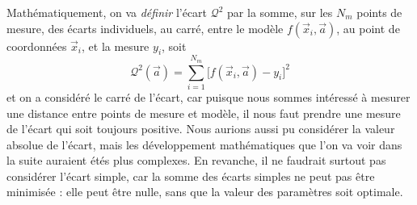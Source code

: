 \begin{center}
\end{center}

Mathématiquement, on va \textit{définir} l'écart $\mathcal{Q}^2$ par la somme, sur les $N_m$ points de mesure, des écarts individuels, au carré, entre le modèle $f(\vec{x}_i,\vec{a})$, au point de coordonnées $\vec{x}_i$, et la mesure $y_i$, soit
\begin{equation}
\mathcal{Q}^2(\vec{a})=\sum\limits_{i=1}^{N_m}\big[f(\vec{x}_i,\vec{a})-y_i\big]^2
\end{equation}
et on a considéré le carré de l'écart, car puisque nous sommes intéressé à mesurer une distance entre points de mesure et modèle, il nous faut prendre une mesure de l'écart qui soit toujours positive. Nous aurions aussi pu considérer la valeur absolue de l'écart, mais les développement mathématiques que l'on va voir dans la suite auraient étés plus complexes. En revanche, il ne faudrait surtout pas considérer l'écart simple, car la somme des écarts simples ne peut pas être minimisée : elle peut être nulle, sans que la valeur des paramètres soit optimale.

